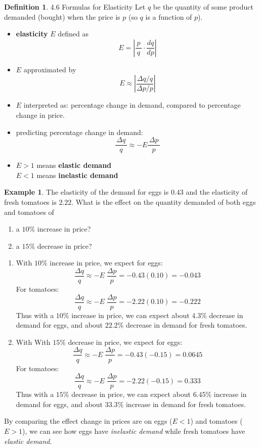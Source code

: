 \documentclass[oneside]{book}
\newcommand{\deriv}[2]{\frac{d#1}{d#2}}
\newcommand{\sfrac}[2]{\frac{\,#1\,}{#2}}
\newcommand{\define}[1]{\textbf{#1}}
\theoremstyle{definition}
\newtheorem{example}{Example}
\newtheorem{definition}{Definition}[section]
\theoremstyle{solution}
\newtheorem*{solution}{Solution}
\newenvironment{solution}{\vspace{2in}\comment}{\endcomment}
\begin{document}
\begin{definition}{4.6 Formulas for Elasticity}
Let $q$ be the quantity of some product demanded (bought) when the
price is $p$ (so $q$ is a function of $p$).
\begin{itemize}
\item \define{elasticity} $E$ defined as
$$
E = \left| \sfrac{p}{q}\cdot \deriv qp\right|
$$
\item $E$ approximated by
$$
E\approx \left| \frac{\Delta q/q}{\Delta p/p}\right|
$$
\item $E$ interpreted as: percentage change in demand, compared to
  percentage change in price.
\item predicting percentage change in demand:
$$
\sfrac{\Delta q}{q} \approx -E\sfrac{\Delta p}{p}
$$
\item $E>1$ means \define{elastic demand}\\
$E<1$ means \define{inelastic demand}
\end{itemize}
\end{definition}



\begin{example}
  The elasticity of the demand for eggs is $0.43$ and the elasticity
  of fresh tomatoes is $2.22$. What is the effect on the quantity
  demanded of both eggs and tomatoes of
  \begin{enumerate}
  \item a $10\%$ increase in price?
  \item a $15\%$ decrease in price?
  \end{enumerate}
\end{example}  

\begin{solution} 
  \begin{enumerate}
  \item With $10\%$ increase in price, we expect for eggs:
    $$
    \frac{\Delta q}{q} \approx -E\; \frac{\Delta p}{p} = -0.43(0.10) =
    -0.043
    $$
    For tomatoes:
    $$
    \frac{\Delta q}{q} \approx -E\; \frac{\Delta p}{p} = -2.22(0.10) =
    -0.222
    $$
    Thus with a $10\%$ increase in price, we can expect about $4.3\%$
    decrease in demand for eggs, and about $22.2\%$ decrease in demand
    for fresh tomatoes.
    
  \item With With $15\%$ decrease in price, we expect for eggs:
    $$
    \frac{\Delta q}{q} \approx -E\; \frac{\Delta p}{p} = -0.43(-0.15)
    = 0.0645
    $$
    For tomatoes:
    $$
    \frac{\Delta q}{q} \approx -E\; \frac{\Delta p}{p} = -2.22(-0.15)
    = 0.333
    $$
    Thus with a $15\%$ decrease in price, we can expect about $6.45\%$
    increase in demand for eggs, and about $33.3\%$ increase in demand
    for fresh tomatoes.
  \end{enumerate}
    
  
  \bigskip By comparing the effect change in prices are on eggs
  ($E < 1$) and tomatoes ($E > 1$), we can see how eggs have
  \emph{inelastic demand} while fresh tomatoes have \emph{elastic
    demand}.
\end{solution}
\end{document}
